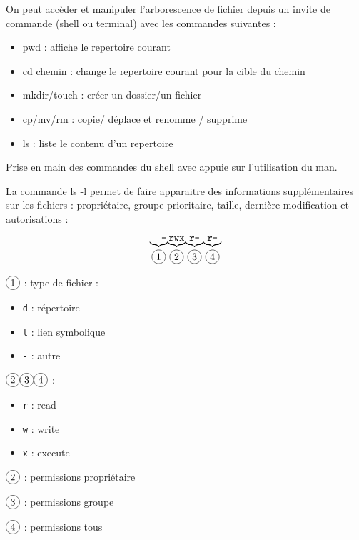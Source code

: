 \begin{impl}
	On peut accèder et manipuler l'arborescence de fichier depuis un invite de commande (shell ou terminal) avec les commandes suivantes : \begin{itemize}[label=$\bullet$]
	\item pwd : affiche le repertoire courant
	\item cd chemin : change le repertoire courant pour la cible du chemin
	\item mkdir/touch : créer un dossier/un fichier
	\item cp/mv/rm : copie/ déplace et renomme / supprime
	\item ls  : liste le contenu d'un repertoire
	\end{itemize}
\end{impl}

\begin{exercise}
	Prise en main des commandes du shell avec appuie sur l'utilisation du man.
\end{exercise}

\begin{impl}
	La commande ls -l permet de faire apparaitre des informations supplémentaires sur les fichiers : propriétaire, groupe prioritaire, taille, dernière modification et autorisations :
	\normalfont
	$$ \underset{\circled{1}}{\underbrace{\texttt{\enspace\enspace-}}} \underset{\circled{2}}{\underbrace{\texttt{rwx}}}\underset{\circled{3}}{\underbrace{\texttt{r--}}}\underset{\circled{4}}{\underbrace{\texttt{r--}}}$$
	
	$\circled{1}$ : type de fichier : \begin{itemize}
		\item[] \qquad \texttt{d} : répertoire
		\item[] \qquad \texttt{l} : lien symbolique
		\item[] \qquad \texttt{-} : autre
	\end{itemize}
	
	$\circled{2}\circled{3}\circled{4}$ : \begin{itemize}
		\item[] \qquad \texttt{r} : read
		\item[] \qquad \texttt{w} : write
		\item[] \qquad \texttt{x} : execute
	\end{itemize}
	
	$\circled{2}$ : permissions propriétaire
	
	$\circled{3}$ : permissions groupe
	
	$\circled{4}$ : permissions tous
	
	
\end{impl}

